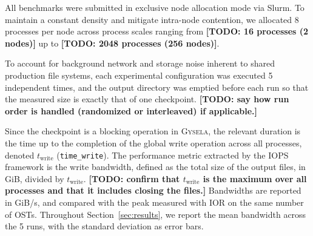 All benchmarks were submitted in exclusive node allocation mode via Slurm. To maintain a constant
density and mitigate intra-node contention, we allocated 8 processes per node across process
scales ranging from \textbf{[TODO: 16 processes (2 nodes)]} up to \textbf{[TODO: 2048 processes
(256 nodes)]}.

To account for background network and storage noise inherent to shared production file systems,
each experimental configuration was executed 5 independent times, and the output directory was
emptied before each run so that the measured size is exactly that of one checkpoint.
\textbf{[TODO: say how run order is handled (randomized or interleaved) if applicable.]}

Since the checkpoint is a blocking operation in \textsc{Gysela}, the relevant duration is the time
up to the completion of the global write operation across all processes, denoted $t_{\text{write}}$
(\texttt{time\_write}). The performance metric extracted by the IOPS framework is the write
bandwidth, defined as the total size of the output files, in GiB, divided by $t_{\text{write}}$.
\textbf{[TODO: confirm that $t_{\text{write}}$ is the maximum over all processes and that it
includes closing the files.]} Bandwidths are reported in GiB/s, and compared with the peak measured
with IOR on the same number of OSTs. Throughout Section~\ref{sec:results}, we report the mean
bandwidth across the 5 runs, with the standard deviation as error bars.